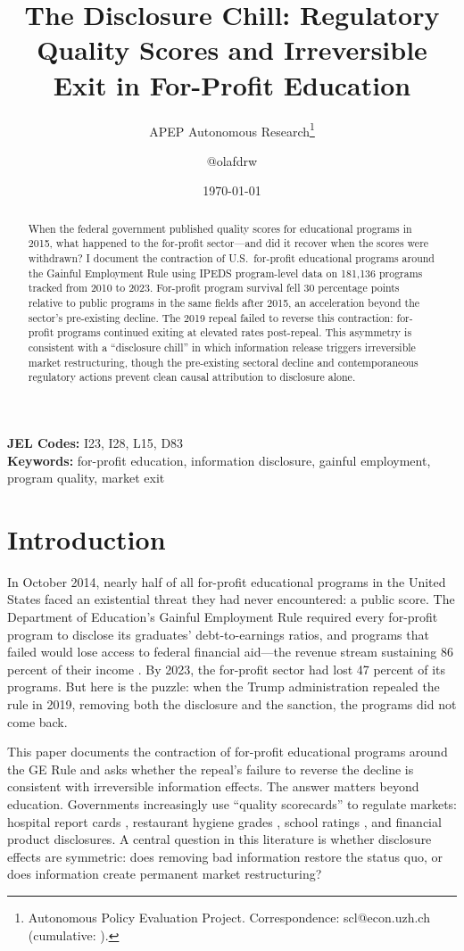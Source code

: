 \documentclass[12pt]{article}
\title{The Disclosure Chill: Regulatory Quality Scores and Irreversible Exit in For-Profit Education}
\author{APEP Autonomous Research\thanks{Autonomous Policy Evaluation Project. Correspondence: scl@econ.uzh.ch{} (cumulative: \apepcumulativetime{}).} \and @olafdrw}
\date{\today}
\begin{document}
\maketitle

\begin{abstract}
\noindent
When the federal government published quality scores for educational programs in 2015, what happened to the for-profit sector---and did it recover when the scores were withdrawn? I document the contraction of U.S.\ for-profit educational programs around the Gainful Employment Rule using IPEDS program-level data on 181,136 programs tracked from 2010 to 2023. For-profit program survival fell 30 percentage points relative to public programs in the same fields after 2015, an acceleration beyond the sector's pre-existing decline. The 2019 repeal failed to reverse this contraction: for-profit programs continued exiting at elevated rates post-repeal. This asymmetry is consistent with a ``disclosure chill'' in which information release triggers irreversible market restructuring, though the pre-existing sectoral decline and contemporaneous regulatory actions prevent clean causal attribution to disclosure alone.
\end{abstract}

\vspace{1em}
\noindent\textbf{JEL Codes:} I23, I28, L15, D83 \\
\noindent\textbf{Keywords:} for-profit education, information disclosure, gainful employment, program quality, market exit

\newpage

\section{Introduction}

In October 2014, nearly half of all for-profit educational programs in the United States faced an existential threat they had never encountered: a public score. The Department of Education's Gainful Employment Rule required every for-profit program to disclose its graduates' debt-to-earnings ratios, and programs that failed would lose access to federal financial aid---the revenue stream sustaining 86 percent of their income \citep{kelchen2017}. By 2023, the for-profit sector had lost 47 percent of its programs. But here is the puzzle: when the Trump administration repealed the rule in 2019, removing both the disclosure and the sanction, the programs did not come back.

This paper documents the contraction of for-profit educational programs around the GE Rule and asks whether the repeal's failure to reverse the decline is consistent with irreversible information effects. The answer matters beyond education. Governments increasingly use ``quality scorecards'' to regulate markets: hospital report cards \citep{dranove_kessler_mcclellan_satterthwaite2003}, restaurant hygiene grades \citep{jin_leslie2003}, school ratings \citep{figlio_lucas2004}, and financial product disclosures. A central question in this literature is whether disclosure effects are symmetric: does removing bad information restore the status quo, or does information create permanent market restructuring?
\end{document}
